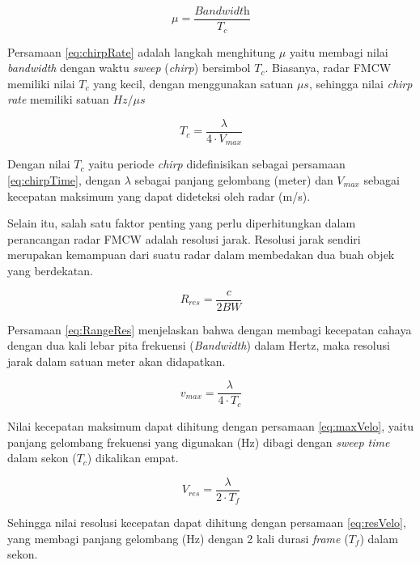 \begin{equation}
	\mu = \frac{\textit{Bandwidth}}{T_{c}}
	\label{eq:chirpRate}
\end{equation}

Persamaan \ref{eq:chirpRate} adalah langkah menghitung $\mu$ yaitu membagi nilai \textit{bandwidth} dengan waktu \textit{sweep} (\textit{chirp}) bersimbol $T_{c}$. Biasanya, radar FMCW memiliki nilai $T_{c}$ yang kecil, dengan menggunakan satuan $\mu s$, sehingga nilai \textit{chirp rate} memiliki satuan $Hz/\mu s$

\begin{equation}
	T_{c} = \frac{\lambda}{4 \cdot V_{max}}
	\label{eq:chirpTime}
\end{equation}

Dengan nilai $T_{c}$ yaitu periode \textit{chirp} didefinisikan sebagai persamaan \ref{eq:chirpTime}, dengan $\lambda$ sebagai panjang gelombang (meter) dan $V_{max}$ sebagai kecepatan maksimum yang dapat dideteksi oleh radar (m/s).

Selain itu, salah satu faktor penting yang perlu diperhitungkan dalam perancangan radar FMCW adalah resolusi jarak. Resolusi jarak sendiri merupakan kemampuan dari suatu radar dalam membedakan dua buah objek yang berdekatan.

\begin{equation}
	R_{res} = \frac{c}{2 BW}
	\label{eq:RangeRes}
\end{equation}

Persamaan \ref{eq:RangeRes} menjelaskan bahwa dengan membagi kecepatan cahaya dengan dua kali lebar pita frekuensi (\textit{Bandwidth}) dalam Hertz, maka resolusi jarak dalam satuan meter akan didapatkan. 

\begin{equation}
	v_{max} = \frac{\lambda}{4 \cdot T_{c}}
	\label{eq:maxVelo}
\end{equation}

Nilai kecepatan maksimum dapat dihitung dengan persamaan \ref{eq:maxVelo}, yaitu panjang gelombang frekuensi yang digunakan (Hz) dibagi dengan \textit{sweep time} dalam sekon ($T_{c}$) dikalikan empat.

\begin{equation}
	V_{res} = \frac{\lambda}{2 \cdot T_{f}}
	\label{eq:resVelo}
\end{equation}

Sehingga nilai resolusi kecepatan dapat dihitung dengan persamaan \ref{eq:resVelo}, yang membagi panjang gelombang (Hz) dengan 2 kali durasi \textit{frame} ($T_{f}$) dalam sekon.

